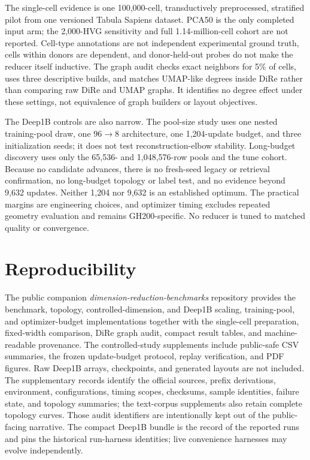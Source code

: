 \documentclass[10pt]{article}
\begin{document}
The single-cell evidence is one 100,000-cell, transductively preprocessed, stratified
pilot from one versioned Tabula Sapiens dataset.  PCA50 is the only completed input arm;
the 2,000-HVG sensitivity and full 1.14-million-cell cohort are not reported.  Cell-type
annotations are not independent experimental ground truth, cells within donors are
dependent, and donor-held-out probes do not make the reducer itself inductive.  The
graph audit checks exact neighbors for 5\% of cells, uses three descriptive builds, and
matches UMAP-like degrees inside DiRe rather than comparing raw DiRe and UMAP graphs.
It identifies no degree effect under these settings, not equivalence of graph builders
or layout objectives.

The Deep1B controls are also narrow.  The pool-size study uses one nested training-pool
draw, one $96\to8$ architecture, one 1,204-update budget, and three initialization
seeds; it does not test reconstruction-elbow stability.  Long-budget discovery uses only
the 65,536- and 1,048,576-row pools and the tune cohort.  Because no candidate advances,
there is no fresh-seed legacy or retrieval confirmation, no long-budget topology or
label test, and no evidence beyond 9,632 updates.  Neither 1,204 nor 9,632 is an
established optimum.  The practical margins are engineering choices, and optimizer
timing excludes repeated geometry evaluation and remains GH200-specific.  No reducer is
tuned to matched quality or convergence.

\section*{Reproducibility}

The public companion \emph{dimension-reduction-benchmarks} repository
\cite{benchmarkrepo} provides the benchmark,
topology, controlled-dimension, and Deep1B scaling, training-pool, and optimizer-budget
implementations together with the single-cell preparation, fixed-width comparison,
DiRe graph audit, compact result tables, and machine-readable provenance.
The controlled-study supplements include public-safe CSV summaries, the frozen
update-budget protocol, replay verification, and PDF figures.  Raw Deep1B arrays,
checkpoints, and generated layouts are not included.  The supplementary records identify
the official sources, prefix derivations, environment, configurations, timing scopes,
checksums, sample identities, failure state, and topology summaries; the text-corpus
supplements also retain complete topology curves.  Those audit identifiers are
intentionally kept out of the public-facing narrative.
The compact Deep1B bundle is the record of the reported runs and pins the historical
run-harness identities; live convenience harnesses may evolve independently.
\end{document}
